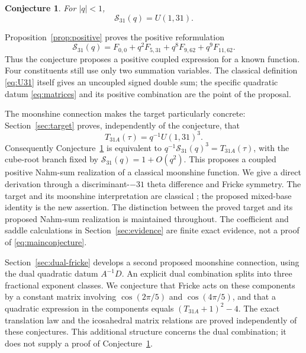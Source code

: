 \documentclass[11pt,reqno]{amsart}
\newcommand{\Ssum}{\mathcal S_{31}}
\newtheorem{conjecture}[theorem]{Conjecture}
\theoremstyle{remark}
\numberwithin{equation}{section}
\begin{document}
\begin{conjecture}\label{conj:main}
For $|q|<1$,
\begin{equation}\label{eq:mainconjecture}
 \Ssum(q)=U(1,31).
\end{equation}
\end{conjecture}

Proposition~\ref{prop:positive} proves the positive reformulation
\begin{equation}\label{eq:positive}
 \Ssum(q)=F_{0,0}+q^2F_{5,31}+q^8F_{9,62}+q^9F_{11,62}.
\end{equation}
Thus the conjecture proposes a positive coupled expression for a known
function. Four constituents still use only two summation variables.
The classical definition \eqref{eq:U31} itself gives an uncoupled signed
double sum; the specific quadratic datum \eqref{eq:matrices} and its
positive combination are the point of the proposal.

The moonshine connection makes the target particularly concrete:
Section~\ref{sec:target} proves, independently of the conjecture, that
\begin{equation}\label{eq:moonshine-intro}
 T_{31A}(\tau)=q^{-1}U(1,31)^3.
\end{equation}
Consequently Conjecture~\ref{conj:main} is equivalent to
$q^{-1}\Ssum(q)^3=T_{31A}(\tau)$, with the cube-root branch fixed by
$\Ssum(q)=1+O(q^2)$. This proposes a coupled positive Nahm-sum
realization of a classical moonshine function. We give a direct
derivation through a discriminant-$-31$ theta difference and Fricke
symmetry. The target and its moonshine interpretation are classical
\cite{CN,OEIS31}; the proposed mixed-base identity is the new assertion.
The distinction between the proved target and its proposed Nahm-sum
realization is maintained throughout. The coefficient and saddle
calculations in Section~\ref{sec:evidence} are finite exact evidence,
not a proof of \eqref{eq:mainconjecture}.

Section~\ref{sec:dual-fricke} develops a second proposed moonshine
connection, using the dual quadratic datum $A^{-1}D$. An explicit
dual combination splits into three fractional exponent classes. We
conjecture that Fricke acts on these components by a constant matrix
involving $\cos(2\pi/5)$ and $\cos(4\pi/5)$, and that a quadratic
expression in the components equals $(T_{31A}+1)^2-4$.
The exact translation law and the icosahedral matrix relations are
proved independently of these conjectures. This additional structure
concerns the dual combination; it does not supply a proof of
Conjecture~\ref{conj:main}.
\end{document}
